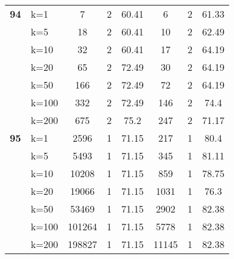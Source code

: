 \begin{table}[htbp]
\begin{tabular}{|l|l|c|c|c|c|c|c|}
    \multicolumn{1}{|r|}{\textbf{94}} & k=1 & 7 & 2 & 60.41 & 6 & 2 & 61.33 \\ 
     & k=5 & 18 & 2 & 60.41 & 10 & 2 & 62.49 \\ 
     & k=10 & 32 & 2 & 60.41 & 17 & 2 & 64.19 \\ 
     & k=20 & 65 & 2 & 72.49 & 30 & 2 & 64.19 \\ 
     & k=50 & 166 & 2 & 72.49 & 72 & 2 & 64.19 \\ 
     & k=100 & 332 & 2 & 72.49 & 146 & 2 & 74.4 \\ 
     & k=200 & 675 & 2 & 75.2 & 247 & 2 & 71.17 \\ \hline
    \multicolumn{1}{|r|}{\textbf{95}} & k=1 & 2596 & 1 & 71.15 & 217 & 1 & 80.4 \\ 
     & k=5 & 5493 & 1 & 71.15 & 345 & 1 & 81.11 \\ 
     & k=10 & 10208 & 1 & 71.15 & 859 & 1 & 78.75 \\ 
     & k=20 & 19066 & 1 & 71.15 & 1031 & 1 & 76.3 \\ 
     & k=50 & 53469 & 1 & 71.15 & 2902 & 1 & 82.38 \\ 
     & k=100 & 101264 & 1 & 71.15 & 5778 & 1 & 82.38 \\ 
     & k=200 & 198827 & 1 & 71.15 & 11145 & 1 & 82.38 \\ \hline
    \end{tabular}
\end{table}
